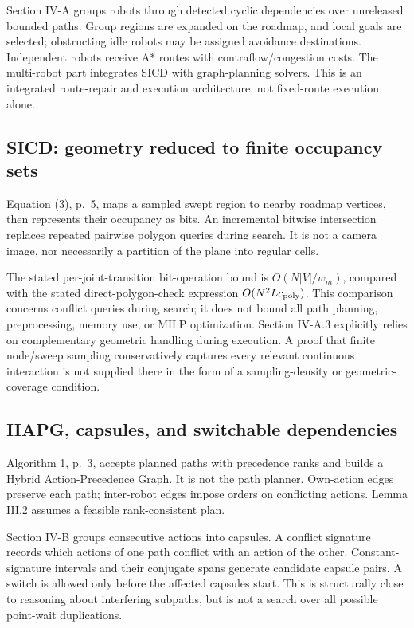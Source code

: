 \documentclass[11pt,a4paper]{article}
\begin{document}
Section IV-A groups robots through detected cyclic dependencies over unreleased
bounded paths. Group regions are expanded on the roadmap, and local goals are
selected; obstructing idle robots may be assigned avoidance destinations.
Independent robots receive A* routes with contraflow/congestion costs.
The multi-robot part integrates SICD with graph-planning solvers.
This is an integrated route-repair and execution architecture, not fixed-route
execution alone.

\subsection{SICD: geometry reduced to finite occupancy sets}
Equation (3), p.~5, maps a sampled swept region to nearby roadmap vertices,
then represents their occupancy as bits. An incremental bitwise intersection
replaces repeated pairwise polygon queries during search. It is not a camera
image, nor necessarily a partition of the plane into regular cells.

The stated per-joint-transition bit-operation bound is
$O(N|V|/w_m)$, compared with the stated direct-polygon-check expression
$O(N^2 L c_{\rm poly})$. This comparison concerns conflict queries during
search; it does not bound all path planning, preprocessing, memory use, or
MILP optimization. Section IV-A.3 explicitly relies on complementary geometric
handling during execution. A proof that finite node/sweep sampling conservatively
captures every relevant continuous interaction is not supplied there in the form
of a sampling-density or geometric-coverage condition.

\subsection{HAPG, capsules, and switchable dependencies}
Algorithm 1, p.~3, accepts planned paths with precedence ranks and builds a
Hybrid Action-Precedence Graph. It is not the path planner. Own-action edges
preserve each path; inter-robot edges impose orders on conflicting actions.
Lemma III.2 assumes a feasible rank-consistent plan.

Section IV-B groups consecutive actions into capsules. A conflict signature
records which actions of one path conflict with an action of the other.
Constant-signature intervals and their conjugate spans generate candidate
capsule pairs. A switch is allowed only before the affected capsules start.
This is structurally close to reasoning about interfering subpaths, but is not
a search over all possible point-wait duplications.
\end{document}
